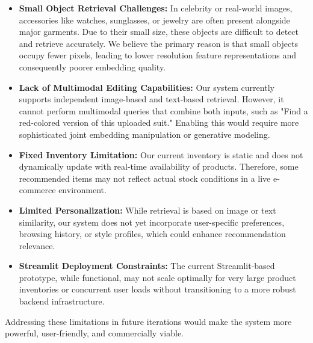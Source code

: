 \begin{itemize}
    \item \textbf{Small Object Retrieval Challenges:} In celebrity or real-world images, accessories like watches, sunglasses, or jewelry are often present alongside major garments. Due to their small size, these objects are difficult to detect and retrieve accurately. We believe the primary reason is that small objects occupy fewer pixels, leading to lower resolution feature representations and consequently poorer embedding quality.

    \item \textbf{Lack of Multimodal Editing Capabilities:} Our system currently supports independent image-based and text-based retrieval. However, it cannot perform multimodal queries that combine both inputs, such as "Find a red-colored version of this uploaded suit." Enabling this would require more sophisticated joint embedding manipulation or generative modeling.

    \item \textbf{Fixed Inventory Limitation:} Our current inventory is static and does not dynamically update with real-time availability of products. Therefore, some recommended items may not reflect actual stock conditions in a live e-commerce environment.

    \item \textbf{Limited Personalization:} While retrieval is based on image or text similarity, our system does not yet incorporate user-specific preferences, browsing history, or style profiles, which could enhance recommendation relevance.

    \item \textbf{Streamlit Deployment Constraints:} The current Streamlit-based prototype, while functional, may not scale optimally for very large product inventories or concurrent user loads without transitioning to a more robust backend infrastructure.
\end{itemize}

Addressing these limitations in future iterations would make the system more powerful, user-friendly, and commercially viable.
